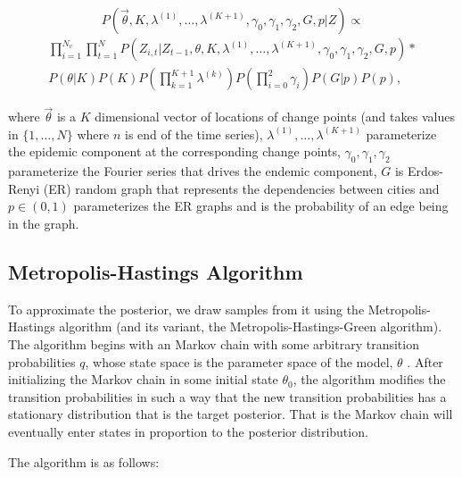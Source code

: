 \documentclass[11pt,a4paper]{article}
\numberwithin{equation}{section}
\begin{document}
\[ P(\vec{\theta}, K, \lambda^{(1)}, \dots, \lambda^{(K+1)}, \gamma_0, \gamma_1, \gamma_2, G,p|Z)  \propto \]
\[\begin{aligned}\prod_{i=1}^{N_v}\prod_{t=1}^N P(Z_{i,t}|Z_{t-1},\theta, K, \lambda^{(1)}, \dots, \lambda^{(K+1)}, \gamma_0, \gamma_1, \gamma_2,G,p)*\\P(\theta|K)P(K)P(\prod_{k=1}^{K+1}\lambda^{(k)} )P(\prod_{i=0}^2 \gamma_i)P(G|p)P(p), \end{aligned} \]

where \(\vec{\theta}\) is a \(K\) dimensional vector of locations of
change points (and takes values in \(\{1,\dots,N\}\) where \(n\) is end
of the time series), \(\lambda^{(1)}, \dots, \lambda^{(K+1)}\)
parameterize the epidemic component at the corresponding change points,
\(\gamma_0, \gamma_1, \gamma_2\) parameterize the Fourier series that
drives the endemic component, \(G\) is Erdos-Renyi (ER) random graph
that represents the dependencies between cities and \(p \in (0,1)\)
parameterizes the ER graphs and is the probability of an edge being in
the graph.

\hypertarget{metropolis-hastings-algorithm}{%
\subsection{Metropolis-Hastings
Algorithm}\label{metropolis-hastings-algorithm}}

To approximate the posterior, we draw samples from it using the
Metropolis-Hastings algorithm (and its variant, the
Metropolis-Hastings-Green algorithm). The algorithm begins with an
Markov chain with some arbitrary transition probabilities \(q\), whose
state space is the parameter space of the model, \(\theta\) . After
initializing the Markov chain in some initial state \(\theta_0\), the
algorithm modifies the transition probabilities in such a way that the
new transition probabilities has a stationary distribution that is the
target posterior. That is the Markov chain will eventually enter states
in proportion to the posterior distribution.

The algorithm is as follows:
\end{document}
